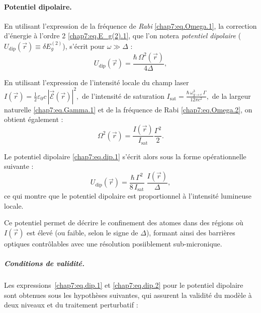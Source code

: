 \paragraph{Potentiel dipolaire.}
En utilisant l'expression de la fréquence de \emph{Rabi} \eqref{chap7:eq.Omega.1}, la correction d’énergie à l’ordre 2 \eqref{chap7:eq.E_g(2).1}, que l’on notera \emph{potentiel dipolaire} (\ie \(U_{\mathrm{dip}}(\vec{r}) \equiv \delta E_g^{(2)}\)), s’écrit pour \( \omega \gg \Delta \) :
\begin{equation}\label{chap7:eq.dip.1}
	U_{\mathrm{dip}}(\vec{r}) = \frac{\hbar \, \Omega^2(\vec{r})}{4 \Delta} ,
\end{equation}

\medskip

En utilisant l’expression de l’intensité locale du champ laser 
\(
I(\vec{r}) = \frac{1}{2} \varepsilon_0 c \, |\vec{\mathcal{E}}(\vec{r})|^2,
\) 
de l’intensité de saturation 
\(
I_{\mathrm{sat}} = \frac{\hbar \, \omega_{\scriptscriptstyle g \rightarrow e}^3 \, \Gamma}{12 \pi c^2},
\) 
de la largeur naturelle \eqref{chap7:eq.Gamma.1} et de la fréquence de Rabi \eqref{chap7:eq.Omega.2}, on obtient également :
\begin{equation}
	\Omega^2(\vec{r}) = \frac{I(\vec{r})}{I_{\mathrm{sat}}} \frac{\Gamma^2}{2}.
\end{equation}

Le potentiel dipolaire \eqref{chap7:eq.dip.1} s’écrit alors sous la forme opérationnelle suivante :
\begin{equation}
	U_{\mathrm{dip}}(\vec{r}) = \frac{\hbar \, \Gamma^2}{8 \, I_{\mathrm{sat}}} \; \frac{I(\vec{r})}{\Delta},
	\label{chap7:eq.dip.2}
\end{equation}
ce qui montre que le potentiel dipolaire est proportionnel à l’intensité lumineuse locale.

\medskip

Ce potentiel permet de décrire le confinement des atomes dans des régions où \( I(\vec{r}) \) est élevé (ou faible, selon le signe de \( \Delta \)), formant ainsi des barrières optiques contrôlables avec une résolution posiiblement sub-micronique.


\subparagraph{Conditions de validité.}

Les expressions~\eqref{chap7:eq.dip.1} et \eqref{chap7:eq.dip.2}  pour le potentiel dipolaire sont obtenues sous les hypothèses suivantes, qui assurent la validité du modèle à deux niveaux et du traitement perturbatif :

\smallskip

